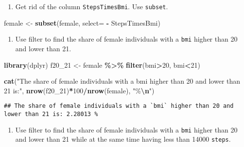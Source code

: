 \documentclass[
]{book}
\newenvironment{Shaded}{\begin{snugshade}}{\end{snugshade}}
\newcommand{\AttributeTok}[1]{\textcolor[rgb]{0.13,0.29,0.53}{#1}}
\newcommand{\DecValTok}[1]{\textcolor[rgb]{0.00,0.00,0.81}{#1}}
\newcommand{\FunctionTok}[1]{\textcolor[rgb]{0.13,0.29,0.53}{\textbf{#1}}}
\newcommand{\NormalTok}[1]{#1}
\newcommand{\OtherTok}[1]{\textcolor[rgb]{0.56,0.35,0.01}{#1}}
\newcommand{\SpecialCharTok}[1]{\textcolor[rgb]{0.81,0.36,0.00}{\textbf{#1}}}
\newcommand{\StringTok}[1]{\textcolor[rgb]{0.31,0.60,0.02}{#1}}
\providecommand{\tightlist}{%
  \setlength{\itemsep}{0pt}\setlength{\parskip}{0pt}}
\begin{document}
\begin{enumerate}
\def\labelenumi{\arabic{enumi}.}
\setcounter{enumi}{4}
\tightlist
\item
  Get rid of the column \texttt{StepsTimesBmi}. Use \texttt{subset}.
\end{enumerate}

\begin{Shaded}
\begin{Highlighting}[]
\NormalTok{female }\OtherTok{\textless{}{-}} \FunctionTok{subset}\NormalTok{(female, }\AttributeTok{select=} \SpecialCharTok{{-}}\NormalTok{ StepsTimesBmi)}
\end{Highlighting}
\end{Shaded}

\begin{enumerate}
\def\labelenumi{\arabic{enumi}.}
\setcounter{enumi}{5}
\tightlist
\item
  Use filter to find the share of female individuals with a \texttt{bmi} higher than 20 and lower than 21.
\end{enumerate}

\begin{Shaded}
\begin{Highlighting}[]
\FunctionTok{library}\NormalTok{(dplyr)}
\NormalTok{f20\_21 }\OtherTok{\textless{}{-}}\NormalTok{ female }\SpecialCharTok{\%\textgreater{}\%}
  \FunctionTok{filter}\NormalTok{(bmi}\SpecialCharTok{\textgreater{}}\DecValTok{20}\NormalTok{, bmi}\SpecialCharTok{\textless{}}\DecValTok{21}\NormalTok{)}

\FunctionTok{cat}\NormalTok{(}\StringTok{"The share of female individuals with a \textasciigrave{}bmi\textasciigrave{} higher than 20 and lower than 21 is:"}\NormalTok{, }\FunctionTok{nrow}\NormalTok{(f20\_21)}\SpecialCharTok{*}\DecValTok{100}\SpecialCharTok{/}\FunctionTok{nrow}\NormalTok{(female), }\StringTok{"\%}\SpecialCharTok{\textbackslash{}n}\StringTok{"}\NormalTok{)}
\end{Highlighting}
\end{Shaded}

\begin{verbatim}
## The share of female individuals with a `bmi` higher than 20 and lower than 21 is: 2.28013 %
\end{verbatim}

\begin{enumerate}
\def\labelenumi{\arabic{enumi}.}
\setcounter{enumi}{6}
\tightlist
\item
  Use filter to find the share of female individuals with a \texttt{bmi} higher than 20 and lower than 21 while at the same time having less than 14000 \texttt{steps}.
\end{enumerate}
\end{document}
